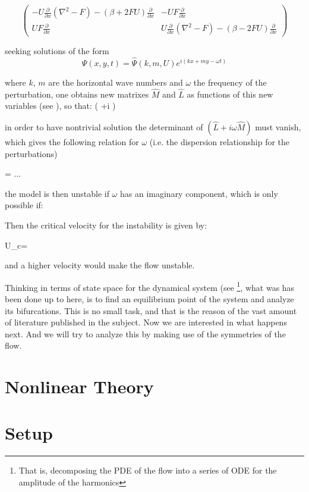 \begin{equation}
\begin{pmatrix}
  -U \frac{\partial}{\partial x}(\nabla ^2-F)-(\beta+2FU)\frac{\partial}{\partial x}
   & -U F \frac{\partial}{\partial x} \\
   U F \frac{\partial}{\partial x}
   & U \frac{\partial}{\partial x}(\nabla ^2-F)-(\beta-2FU)\frac{\partial}{\partial x}
\end{pmatrix}
\label{Mmatrix2}
\end{equation}

seeking solutions of the form 
\begin{equation}
\Psi (x,y,t)=\hat{\Psi} (k,m,U) e^{i(kx+my-\omega t)}
\label{PRT}
\end{equation}

where $k$, $m$ are the horizontal wave numbers and $\omega$ the frequency of the perturbation, one obtains new matrixes $\hat{M}$ and $\hat{L}$ as functions of this new variables (see ), so that: 
\beq
\left( +i \omega {}\right) 

in order to have nontrivial solution the determinant of $\left( \hat{L}+i \omega \hat{M}\right)$ must vanish, which gives the following relation for $\omega$ (i.e. the dispersion relationship for the perturbations)

\beq
\omega = ...%

the model is then unstable if $\omega$ has an imaginary component, which is only possible if:
\beq

Then the critical velocity for the instability is given by:

\beq
U_c=%

and a higher velocity would make the flow unstable. 

Thinking in terms of state space for the dynamical system (see  \footnote{That is, decomposing the PDE of the flow into a series of ODE for the amplitude of the harmonics}, what was has been done up to here, is to find an equilibrium point of the system and analyze its bifurcations. This is no small task, and that is the reason of the vast amount of literature published in the subject.
Now we are interested in what happens next. And we will try to analyze this by making use of the symmetries of the flow. 
\section{Nonlinear Theory}
\label{s:nonlinear}
\section{Setup}
\label{s:setup}
